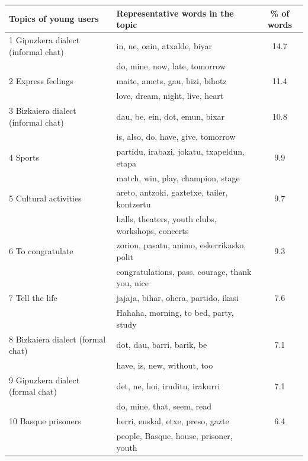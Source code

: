 \documentclass[information,article,submit,moreauthors,pdftex,10pt,a4paper]{Definitions/mdpi}
\begin{document}
\begin{table}[H]
  \centering
  \begin{tabular}{llc}
    \hline
    \textbf{Topics of young users} &  \textbf{Representative words in the topic} & \textbf{\% of words} \\ \hline \hline
                   1  Gipuzkera dialect (informal chat) & in, ne, oain, atxalde, biyar & 14.7 \\
                   & do, mine, now, late, tomorrow & \\ \hline
                   2  Express feelings & maite, amets, gau, bizi, bihotz & 11.4 \\
                   & love, dream, night, live, heart & \\ \hline
                   3  Bizkaiera dialect (informal chat) & dau, be, ein, dot, emun, bixar & 10.8 \\
                   & is, also, do, have, give, tomorrow & \\ \hline
                   4  Sports & partidu, irabazi, jokatu, txapeldun, etapa & 9.9 \\
                   & match, win, play, champion, stage & \\ \hline
                   5  Cultural activities & areto, antzoki, gaztetxe, tailer, kontzertu & 9.7 \\
                   & halls, theaters, youth clubs, workshops, concerts & \\ \hline
                   6  To congratulate & zorion, pasatu, animo, eskerrikasko, polit & 9.3 \\
                   & congratulations, pass, courage, thank you, nice & \\ \hline
                   7  Tell the life & jajaja, bihar, ohera, partido, ikasi & 7.6 \\
                   & Hahaha, morning, to bed, party, study & \\ \hline
                   8  Bizkaiera dialect (formal chat) & dot, dau, barri, barik, be & 7.1 \\
                   & have, is, new, without, too & \\ \hline
                   9  Gipuzkera dialect (formal chat) & det, ne, hoi, iruditu, irakurri  & 7.1 \\
                   & do, mine, that, seem, read & \\ \hline
                   10 Basque prisoners & herri, euskal, etxe, preso, gazte & 6.4 \\
                   & people, Basque, house, prisoner, youth & \\ \hline

\end{tabular}
\end{table}
\end{document}
